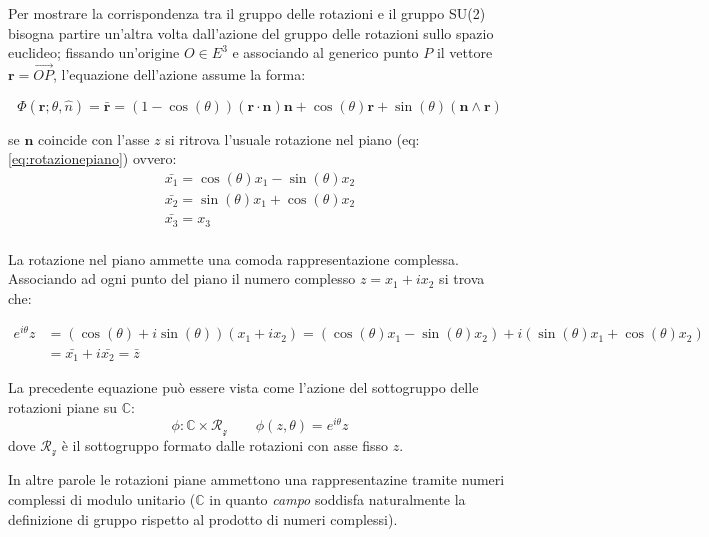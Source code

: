 \documentclass[11pt]{report}
\theoremstyle{plain}
\theoremstyle{definition}
\theoremstyle{remark}
\begin{document}
Per mostrare la corrispondenza tra il gruppo delle rotazioni e il gruppo SU(2) bisogna partire un'altra volta dall'azione del gruppo delle rotazioni sullo spazio euclideo; fissando un'origine $O \in E^{3}$ e associando al generico punto $P$ il vettore $\textbf{r}=\vec{OP}$, l'equazione dell'azione assume la forma:

\begin{equation}\label{eq:rotazionevettori}
\Phi(\textbf{r}; \theta, \hat{n}) = \bar{\textbf{r}} = (1-\cos(\theta))(\textbf{r}\cdot\textbf{n})\textbf{n} + \cos(\theta)\textbf{r} +\sin(\theta)(\textbf{n}\wedge\textbf{r})
\end{equation}

se $\textbf{n}$ coincide con l'asse $z$ si ritrova l'usuale rotazione nel piano (eq:\ref{eq:rotazionepiano}) ovvero:
	\begin{displaymath}
			\begin{array}{c}
 			\bar{x_{1}} = \cos(\theta) x_{1} - \sin(\theta) x_{2}\\	
 			\bar{x_{2}} = \sin(\theta) x_{1} + \cos(\theta) x_{2}\\
  			\bar{x_{3}} = x_{3}\\
  			\end{array}
	\end{displaymath}

La rotazione nel piano ammette una comoda rappresentazione complessa. Associando ad ogni punto del piano il numero complesso $z= x_{1}+ix_{2}$ si trova che:

	\begin{displaymath}\begin{split}
			e^{i\theta}z &= (\cos(\theta)+i\sin(\theta))(x_{1}+ix_{2})=(\cos(\theta)x_{1}-\sin(\theta)x_{2}) + i(\sin(\theta)x_{1}+\cos(\theta)x_{2})\\ &=\bar{x_{1}} + i\bar{x_{2}}=\bar{z}
	\end{split}\end{displaymath}

La precedente equazione può essere vista come l'azione del sottogruppo delle rotazioni piane su $\mathbb{C}$:
$$\phi: \mathbb{C} \times \mathscr{R_{z}} \qquad \phi( z, \theta) = e^{i\theta}z$$
dove $\mathscr{R_{z}}$ è il sottogruppo formato dalle rotazioni con asse fisso $z$.

In altre parole le rotazioni piane ammettono una rappresentazine tramite numeri complessi di modulo unitario ($\mathbb{C}$ in quanto \emph{campo} soddisfa naturalmente la definizione di gruppo rispetto al prodotto di numeri complessi).
\end{document}
